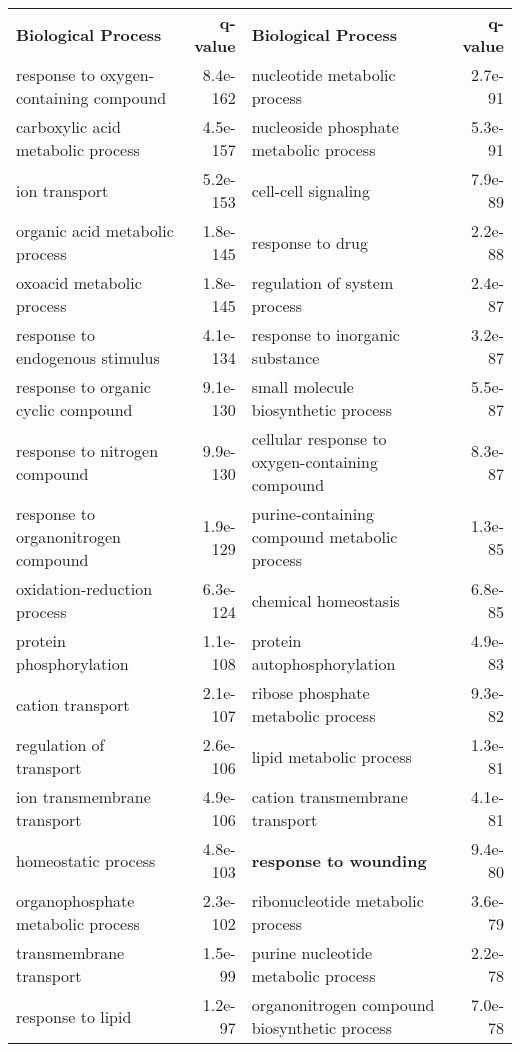 \documentclass[fleqn,10pt]{SelfArx} %
\begin{document}
\begin{table}[!htb]
	\centering
	\scriptsize
	\begin{tabularx}{\textwidth}{lRlR}
		\textbf{\color{white} Biological Process} & \textbf{\color{white} q-value} & \textbf{\color{white} Biological Process} & \textbf{\color{white} q-value}\\
		response to oxygen-containing compound & 8.4e-162 & nucleotide metabolic process & 2.7e-91 \\ 
		carboxylic acid metabolic process & 4.5e-157 & nucleoside phosphate metabolic process & 5.3e-91 \\ 
		ion transport & 5.2e-153 & cell-cell signaling & 7.9e-89 \\ 
		organic acid metabolic process & 1.8e-145 & response to drug & 2.2e-88 \\ 
		oxoacid metabolic process & 1.8e-145 & regulation of system process & 2.4e-87 \\ 
		response to endogenous stimulus & 4.1e-134 & response to inorganic substance & 3.2e-87 \\ 
		response to organic cyclic compound & 9.1e-130 & small molecule biosynthetic process & 5.5e-87 \\ 
		response to nitrogen compound & 9.9e-130 & cellular response to oxygen-containing compound & 8.3e-87 \\ 
		response to organonitrogen compound & 1.9e-129 & purine-containing compound metabolic process & 1.3e-85 \\ 
		oxidation-reduction process & 6.3e-124 & chemical homeostasis & 6.8e-85 \\ 
		protein phosphorylation & 1.1e-108 & protein autophosphorylation & 4.9e-83 \\ 
		cation transport & 2.1e-107 & ribose phosphate metabolic process & 9.3e-82 \\ 
		regulation of transport & 2.6e-106 & lipid metabolic process & 1.3e-81 \\ 
		ion transmembrane transport & 4.9e-106 & cation transmembrane transport & 4.1e-81 \\ 
		homeostatic process & 4.8e-103 & \textbf{response to wounding} & 9.4e-80 \\ 
		organophosphate metabolic process & 2.3e-102 & ribonucleotide metabolic process & 3.6e-79 \\ 
		transmembrane transport & 1.5e-99 & purine nucleotide metabolic process & 2.2e-78 \\ 
		response to lipid & 1.2e-97 & organonitrogen compound biosynthetic process & 7.0e-78 \\ 

\end{tabularx}
\end{table}
\end{document}
